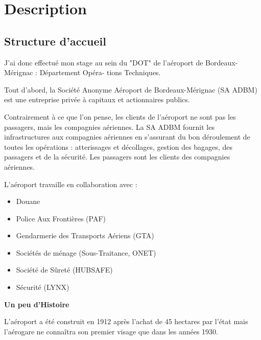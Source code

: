 \chapter{Description}

\section{Structure d'accueil}

J’ai donc effectué mon stage au sein du "DOT" de l’aéroport de Bordeaux-Mérignac : Département Opéra-
tions Techniques.

Tout d’abord, la Société Anonyme Aéroport de Bordeaux-Mérignac (SA ADBM) est une entreprise privée à capitaux et actionnaires publics.\newline

Contrairement à ce que l’on pense, les clients de l’aéroport ne sont pas les passagers, mais les compagnies
aériennes. La SA ADBM fournit les infrastructures aux compagnies aériennes en s’assurant du bon déroulement
de toutes les opérations : atterissages et décollages, gestion des bagages, des passagers et de la sécurité. Les
passagers sont les clients des compagnies aériennes.\newline

L’aéroport travaille en collaboration avec :


\begin{itemize}
  \item Douane
  \item Police Aux Frontières (PAF)
  \item Gendarmerie des Transports Aériens (GTA)
  \item Sociétés de ménage (Sous-Traitance, ONET)
  \item Société de Sûreté (HUBSAFE)
  \item Sécurité (LYNX)\newline
\end{itemize}


\textbf{Un peu d'Histoire}\newline

L'aéroport a été construit en 1912 après l'achat de 45 hectares par l'état mais l'aérogare ne connaîtra son premier visage que dans les années 1930.

